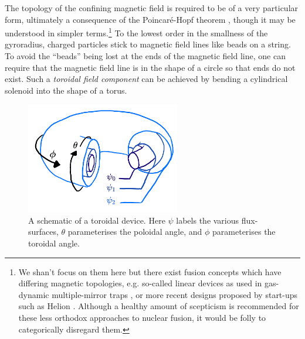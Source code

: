 The topology of the confining magnetic field is required to be of a very particular form, ultimately a consequence of the Poincar\'e-Hopf theorem \cite{hopf1927vektorfelder}, though it may be understood in simpler terms.\footnote{We shan't focus on them here but there exist fusion concepts which have differing magnetic topologies, e.g. so-called linear devices as used in gas-dynamic multiple-mirror traps \cite{burdakov2011concept,beklemishev2013novosibirsk,ivanov2017gas}, or more recent designs proposed by start-ups such as Helion \cite{waldrop2014fusion}. Although a healthy amount of scepticism is recommended for these less orthodox approaches to nuclear fusion, it would be folly to categorically disregard them.} To the lowest order in the smallness of the gyroradius, charged particles stick to magnetic field lines like beads on a string. To avoid the ``beads'' being lost at the ends of the magnetic field line, one can require that the magnetic field line is in the shape of a circle so that ends do not exist. Such a {\it toroidal field component} can be achieved by bending a cylindrical solenoid into the shape of a torus. \par 
\begin{figure}
    \centering
    \includegraphics[width=0.6\textwidth]{3_chapters/0_introduction/img/tokamak.pdf}
    \caption{A schematic of a toroidal device. Here $\psi$ labels the various flux-surfaces, $\theta$ parameterises the poloidal angle, and $\phi$ parameterises the toroidal angle.}
    \label{fig: torus schematic}
\end{figure}

